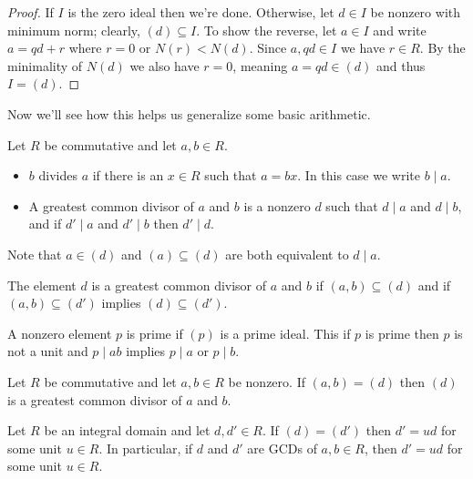 \documentclass[../m171main.tex]{subfiles}
\begin{document}
\begin{proof}
    If $I$ is the zero ideal then we're done.
    Otherwise, let $d \in I$ be nonzero with minimum norm; clearly, $(d) \subseteq I$.
    To show the reverse, let $a \in I$ and write $a = qd + r$ where $r = 0$ or $N(r) < N(d)$.
    Since $a,qd \in I$ we have $r \in R$.
    By the minimality of $N(d)$ we also have $r = 0$, meaning $a = qd \in (d)$ and thus $I = (d)$.
\end{proof}

Now we'll see how this helps us generalize some basic arithmetic.

\begin{definition}[Divisor]
    Let $R$ be commutative and let $a,b \in R$.
    \begin{itemize}[topsep=0pt]
        \item $b$ divides $a$ if there is an $x \in R$ such that $a = bx$.
        In this case we write $b \mid a$.

        \item A greatest common divisor of $a$ and $b$ is a nonzero $d$ such that $d \mid a$ and $d \mid b$, and if $d' \mid a$ and $d' \mid b$ then $d' \mid d$.
    \end{itemize}
\end{definition}

Note that $a \in (d)$ and $(a) \subseteq (d)$ are both equivalent to $d \mid a$.

\begin{definition}
    The element $d$ is a greatest common divisor of $a$ and $b$ if $(a,b) \subseteq (d)$ and if $(a,b) \subseteq (d')$ implies $(d) \subseteq (d')$.
\end{definition}

\begin{definition}[Prime]
    A nonzero element $p$ is prime if $(p)$ is a prime ideal.
    This if $p$ is prime then $p$ is not a unit and $p \mid ab$ implies $p \mid a$ or $p \mid b$.
\end{definition}

\begin{theorem}[]
    Let $R$ be commutative and let $a,b \in R$ be nonzero.
    If $(a,b) = (d)$ then $(d)$ is a greatest common divisor of $a$ and $b$.
\end{theorem}

\begin{theorem}[]
    Let $R$ be an integral domain and let $d, d' \in R$.
    If $(d) = (d')$ then $d' = ud$ for some unit $u \in R$.
    In particular, if $d$ and $d'$ are GCDs of $a,b \in R$, then $d' = ud$ for some unit $u \in R$.
\end{theorem}
\end{document}
